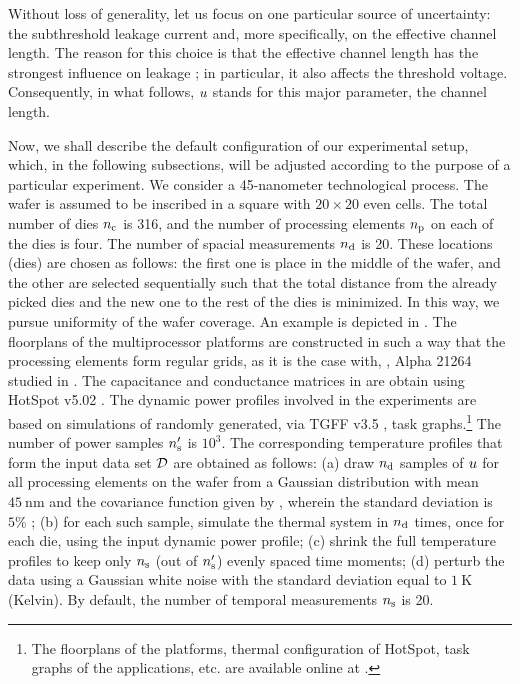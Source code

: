 Without loss of generality, let us focus on one particular source of uncertainty: the subthreshold leakage current and, more specifically, on the effective channel length. The reason for this choice is that the effective channel length has the strongest influence on leakage \cite{juan2011, juan2012}; in particular, it also affects the threshold voltage. Consequently, in what follows, $u$ stands for this major parameter, the channel length.



Now, we shall describe the default configuration of our experimental setup, which, in the following subsections, will be adjusted according to the purpose of a particular experiment. We consider a 45-nanometer technological process. The wafer is assumed to be inscribed in a square with $20 \times 20$ even cells. The total number of dies ${n_{\text{c}}}$ is 316, and the number of processing elements ${n_\text{p}}$ on each of the dies is four.
The number of spacial measurements ${n_{\text{d}}}$ is 20. These locations (dies) are chosen as follows: the first one is place in the middle of the wafer, and the other are selected sequentially such that the total distance from the already picked dies and the new one to the rest of the dies is minimized. In this way, we pursue uniformity of the wafer coverage. An example is depicted in .
The floorplans of the multiprocessor platforms are constructed in such a way that the processing elements form regular grids, as it is the case with, \eg, Alpha 21264 studied in \cite{juan2011}. The capacitance and conductance matrices in  are obtain using HotSpot v5.02 \cite{hotspot}. The dynamic power profiles involved in the experiments are based on simulations of randomly generated, via TGFF v3.5 \cite{dick1998}, task graphs.\footnote{The floorplans of the platforms, thermal configuration of HotSpot, task graphs of the applications, etc. are available online at \cite{sources}.} The number of power samples ${n_\text{s}'}$ is $10^3$.
The corresponding temperature profiles that form the input data set $\mathcal{D}$ are obtained as follows: (a) draw ${n_{\text{d}}}$ samples of $u$ for all processing elements on the wafer from a Gaussian distribution with mean $45~\text{nm}$ and the covariance function given by , wherein the standard deviation is $5\%$ \cite{juan2011, juan2012}; (b) for each such sample, simulate the thermal system in  ${n_{\text{d}}}$ times, once for each die, using the input dynamic power profile; (c) shrink the full temperature profiles to keep only ${n_\text{s}}$ (out of ${n_\text{s}'}$) evenly spaced time moments; (d) perturb the data using a Gaussian white noise with the standard deviation equal to $1~\text{K}$ (Kelvin). By default, the number of temporal measurements ${n_\text{s}}$ is 20.

